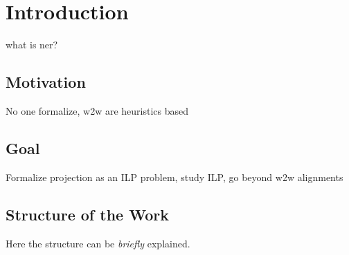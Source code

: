 \chapter{Introduction}
\label{sec:introduction}
what is ner?

\section{Motivation}
No one formalize, w2w are heuristics based

\section{Goal}
Formalize projection as an ILP problem, study ILP, go beyond w2w alignments

\section{Structure of the Work}
Here the structure can be \emph{briefly} explained.


